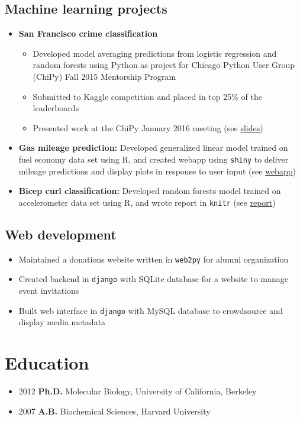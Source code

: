 \documentclass[letterpaper,12pt]{article}
\begin{document}
\subsection*{Machine learning projects}
\begin{itemize}
    \item \textbf{San Francisco crime classification}
        \begin{itemize}
            \item Developed model averaging predictions from logistic regression and random forests using Python as project for Chicago Python User Group (ChiPy) Fall 2015 Mentorship Program
            \item Submitted to Kaggle competition and placed in top 25\% of the leaderboards
            \item Presented work at the ChiPy January 2016 meeting (see \href{http://hnlee.github.io/sfcrimes/#/}{slides})
        \end{itemize}
    \item \textbf{Gas mileage prediction:} Developed generalized linear model trained on fuel economy data set using R, and created webapp using \texttt{shiny} to deliver mileage predictions and display plots in response to user input (see \href{https://hnlee.shinyapps.io/shinyapp/}{webapp})
    \item \textbf{Bicep curl classification:} Developed random forests model trained on accelerometer data set using R, and wrote report in \texttt{knitr} (see \href{http://hnlee.github.io/pmlCourseProject/}{report}) 
\end{itemize}
 
\subsection*{Web development}
\begin{itemize}
    \item Maintained a donations website written in \texttt{web2py} for alumni organization
    \item Created backend in \texttt{django} with SQLite database for a website to manage event invitations
    \item Built web interface in \texttt{django} with MySQL database to crowdsource and display media metadata
\end{itemize}

\section*{Education}
\begin{itemize}
    \item 2012 \textbf{Ph.D.} Molecular Biology, University of California, Berkeley
    \item 2007 \textbf{A.B.} Biochemical Sciences, Harvard University
\end{itemize}
\end{document}
